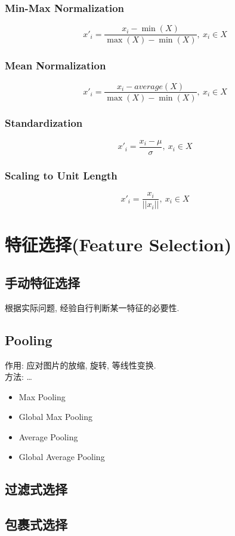 \documentclass[oneside]{book}
\begin{document}
				\subsubsection{Min-Max Normalization}
					$$x'_i = \frac{x_i - \min{(X)}}{\max{(X)} - \min{(X)}},~x_i\in X$$
				\subsubsection{Mean Normalization}
					$$x'_i = \frac{x_i - average(X)}{\max{(X)} - \min{(X)}},~x_i\in X$$
				\subsubsection{Standardization}
					$$x'_i = \frac{x_i - \mu}{\sigma},~x_{i}\in X$$
				\subsubsection{Scaling to Unit Length}
					 $$x'_i = \frac{x_{i}}{||x_{i}||}, ~x_i \in X$$
			\section{特征选择(Feature Selection)}
				\subsection{手动特征选择}
					根据实际问题, 经验自行判断某一特征的必要性.
				\subsection{Pooling}
					作用: 应对图片的放缩, 旋转, 等线性变换.\\
					方法: \dots
					\begin{itemize}
						\item Max Pooling
						\item Global Max Pooling
						\item Average Pooling
						\item Global Average Pooling
					\end{itemize}

				\subsection{过滤式选择}

				\subsection{包裹式选择}
\end{document}
